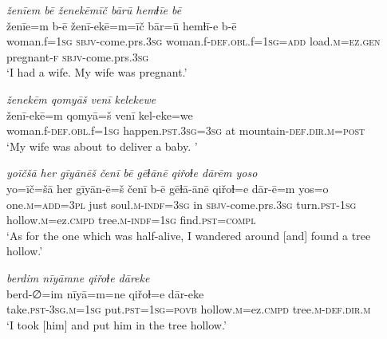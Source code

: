 \ea \label{ZQ.13}
\textit{ženīem bē ženekēmīč bārū hemɫīe bē} \\ 
\gll ženīe=m b-ē ženī-ekē=m=īč bār=ū hemɫī-e b-ē \\ 
 woman.f\textsc{=\textsc{1sg}} \textsc{sbjv-}come.prs\textsc{.3sg} woman.f\textsc{-def}\textsc{.obl}.f\textsc{=\textsc{1sg}}\textsc{=add} load\textsc{.m}\textsc{=ez.gen} pregnant\textsc{-f} \textsc{sbjv-}come.prs\textsc{.3sg} \\ 
\glt `I had a wife. My wife was pregnant.'
\z 
 
\ea \label{ZQ.14}
\textit{ženekēm qomyāš venī kelekewe} \\ 
\gll ženī-ekē=m qomyā=š venī kel-eke=we \\ 
 woman.f\textsc{-def}\textsc{.obl}.f\textsc{=\textsc{1sg}} happen\textsc{.pst}\textsc{.3sg}\textsc{=3sg} at mountain\textsc{-def}\textsc{.dir}\textsc{.m}\textsc{=\textsc{post}} \\ 
\glt `My wife was about to deliver a baby. '
\z 
 
\ea \label{ZQ.23}
\textit{yoīčšā her gīyānēš čenī bē gēɫānē qiřoɫe dārēm yoso} \\ 
\gll yo=īč=šā her gīyān-ē=š čenī b-ē gēɫā-ānē qiřoɫ=e dār-ē=m yos=o \\ 
 one\textsc{.m}\textsc{=add}\textsc{=3pl} just soul\textsc{.m}\textsc{-indf}\textsc{=3sg} in \textsc{sbjv-}come.prs\textsc{.3sg} turn\textsc{.pst}\textsc{-\textsc{1sg}} hollow\textsc{.m}=ez\textsc{.cmpd} tree\textsc{.m}\textsc{-indf}\textsc{=\textsc{1sg}} find\textsc{.pst}\textsc{=compl} \\ 
\glt `As for the one which was half-alive, I wandered around [and] found a tree hollow.'
\z 
 
\ea \label{ZQ.24}
\textit{berdim nīyāmne qiřoɫe dāreke} \\ 
\gll berd-∅=im nīyā=m=ne qiřoɫ=e dār-eke \\ 
 take\textsc{.pst}\textsc{-3sg}\textsc{.m}\textsc{=\textsc{1sg}} put\textsc{.pst}\textsc{=\textsc{1sg}}\textsc{=\textsc{povb}} hollow\textsc{.m}=ez\textsc{.cmpd} tree\textsc{.m}\textsc{-def}\textsc{.dir}\textsc{.m} \\ 
\glt `I took [him] and put him in the tree hollow.'
\z 
 
